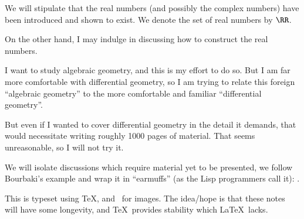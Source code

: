 \begin{remark}
We will stipulate that the real numbers (and possibly the complex
numbers) have been introduced and shown to exist. We denote the set of
real numbers by $\RR$.

On the other hand, I may indulge in discussing how to construct the
real numbers.
\end{remark}

\begin{remark}
I want to study algebraic geometry, and this is my effort to do
so. But I am far more comfortable with differential geometry, so I am
trying to relate this foreign ``algebraic geometry'' to the more
comfortable and familiar ``differential geometry''.

But even if I wanted to cover differential geometry in the detail it
demands, that would necessitate writing roughly 1000 pages of
material. That seems unreasonable, so I will not try it.
\end{remark}

\begin{remark}
We will isolate discussions which require material yet to be
presented, we follow Bourbaki's example and wrap it in ``earmuffs''
(as the Lisp programmers call it): \future{$\cdots$}.
\end{remark}

\begin{remark}
This is typeset using \TeX, and \MP\ for images. The idea/hope is
that these notes will have some longevity, and \TeX\ provides
stability which \LaTeX\ lacks.
\end{remark}